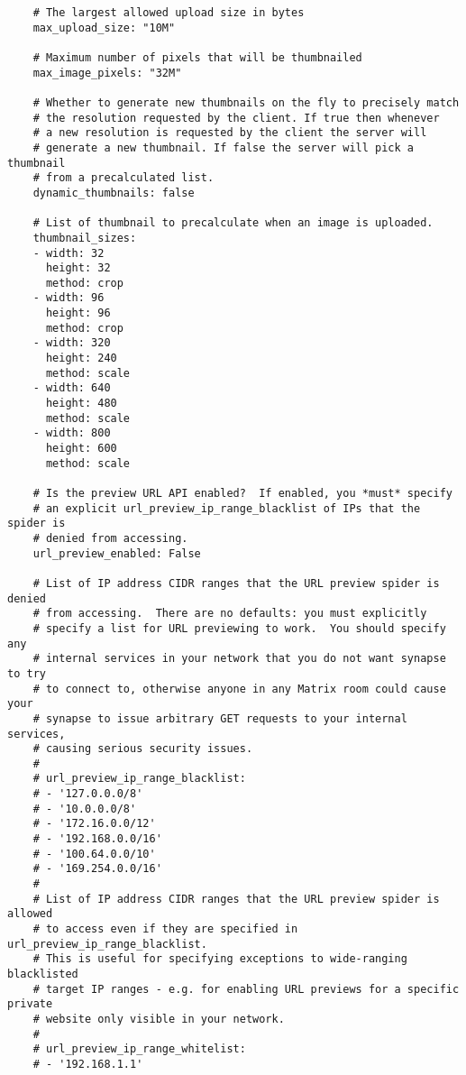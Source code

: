 \begin{lstlisting}
    # The largest allowed upload size in bytes
    max_upload_size: "10M"
    
    # Maximum number of pixels that will be thumbnailed
    max_image_pixels: "32M"
    
    # Whether to generate new thumbnails on the fly to precisely match
    # the resolution requested by the client. If true then whenever
    # a new resolution is requested by the client the server will
    # generate a new thumbnail. If false the server will pick a thumbnail
    # from a precalculated list.
    dynamic_thumbnails: false
    
    # List of thumbnail to precalculate when an image is uploaded.
    thumbnail_sizes:
    - width: 32
      height: 32
      method: crop
    - width: 96
      height: 96
      method: crop
    - width: 320
      height: 240
      method: scale
    - width: 640
      height: 480
      method: scale
    - width: 800
      height: 600
      method: scale
    
    # Is the preview URL API enabled?  If enabled, you *must* specify
    # an explicit url_preview_ip_range_blacklist of IPs that the spider is
    # denied from accessing.
    url_preview_enabled: False
    
    # List of IP address CIDR ranges that the URL preview spider is denied
    # from accessing.  There are no defaults: you must explicitly
    # specify a list for URL previewing to work.  You should specify any
    # internal services in your network that you do not want synapse to try
    # to connect to, otherwise anyone in any Matrix room could cause your
    # synapse to issue arbitrary GET requests to your internal services,
    # causing serious security issues.
    #
    # url_preview_ip_range_blacklist:
    # - '127.0.0.0/8'
    # - '10.0.0.0/8'
    # - '172.16.0.0/12'
    # - '192.168.0.0/16'
    # - '100.64.0.0/10'
    # - '169.254.0.0/16'
    #
    # List of IP address CIDR ranges that the URL preview spider is allowed
    # to access even if they are specified in url_preview_ip_range_blacklist.
    # This is useful for specifying exceptions to wide-ranging blacklisted
    # target IP ranges - e.g. for enabling URL previews for a specific private
    # website only visible in your network.
    #
    # url_preview_ip_range_whitelist:
    # - '192.168.1.1'
    

\end{lstlisting}
